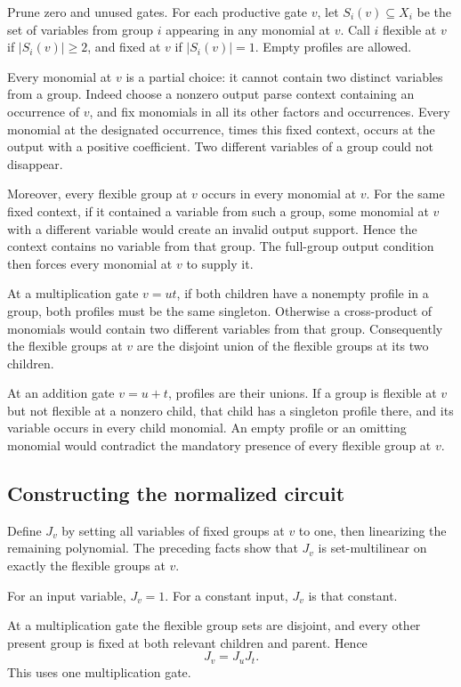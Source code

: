 \documentclass[11pt]{article}
\theoremstyle{definition}
\theoremstyle{remark}
\numberwithin{equation}{section}
\begin{document}
Prune zero and unused gates. For each productive gate \(v\),
let \(S_i(v)\subseteq X_i\) be the set of variables from group
\(i\) appearing in any monomial at \(v\). Call \(i\) flexible
at \(v\) if \(|S_i(v)|\ge2\), and fixed at \(v\) if
\(|S_i(v)|=1\). Empty profiles are allowed.

Every monomial at \(v\) is a partial choice: it cannot contain
two distinct variables from a group. Indeed choose a nonzero
output parse context containing an occurrence of \(v\), and
fix monomials in all its other factors and occurrences.
Every monomial at the designated occurrence, times this
fixed context, occurs at the output with a positive coefficient.
Two different variables of a group could not disappear.

Moreover, every flexible group at \(v\) occurs in every
monomial at \(v\). For the same fixed context, if it contained
a variable from such a group, some monomial at \(v\) with a
different variable would create an invalid output support.
Hence the context contains no variable from that group.
The full-group output condition then forces every monomial
at \(v\) to supply it.

At a multiplication gate \(v=u t\), if both children have a
nonempty profile in a group, both profiles must be the same
singleton. Otherwise a cross-product of monomials would
contain two different variables from that group. Consequently
the flexible groups at \(v\) are the disjoint union of the
flexible groups at its two children.

At an addition gate \(v=u+t\), profiles are their unions.
If a group is flexible at \(v\) but not flexible at a
nonzero child, that child has a singleton profile there,
and its variable occurs in every child monomial. An empty
profile or an omitting monomial would contradict the
mandatory presence of every flexible group at \(v\).

\subsection{Constructing the normalized circuit}

Define \(J_v\) by setting all variables of fixed groups at
\(v\) to one, then linearizing the remaining polynomial.
The preceding facts show that \(J_v\) is set-multilinear on
exactly the flexible groups at \(v\).

For an input variable, \(J_v=1\). For a constant input,
\(J_v\) is that constant.

At a multiplication gate the flexible group sets are disjoint,
and every other present group is fixed at both relevant
children and parent. Hence
\begin{equation}\label{eq:CN4}
J_v=J_uJ_t.
\end{equation}
This uses one multiplication gate.
\end{document}
